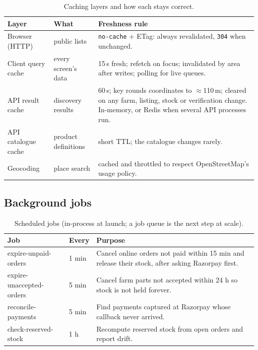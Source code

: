 \documentclass[11pt,a4paper]{article}
\begin{document}
\begin{table}[H]\centering\small
\begin{tabularx}{\linewidth}{@{}p{3cm}p{3.6cm}L@{}}
\toprule
\textbf{Layer} & \textbf{What} & \textbf{Freshness rule} \\
\midrule
Browser (HTTP) & public lists & \texttt{no-cache} + ETag: always revalidated, \texttt{304} when unchanged. \\
Client query cache & every screen's data & 15\,s fresh; refetch on focus; invalidated by area after writes; polling for live queues. \\
API result cache & discovery results & 60\,s; key rounds coordinates to $\approx$110\,m; cleared on any farm, listing, stock or verification change. In-memory, or Redis when several API processes run. \\
API catalogue cache & product definitions & short TTL; the catalogue changes rarely. \\
Geocoding & place search & cached and throttled to respect OpenStreetMap's usage policy. \\
\bottomrule
\end{tabularx}
\caption{Caching layers and how each stays correct.}
\end{table}

\subsection{Background jobs}

\begin{table}[H]\centering\small
\begin{tabular}{@{}llp{8cm}@{}}
\toprule
\textbf{Job} & \textbf{Every} & \textbf{Purpose} \\
\midrule
expire-unpaid-orders & 1 min & Cancel online orders not paid within 15 min and release their stock, after asking Razorpay first. \\
expire-unaccepted-orders & 5 min & Cancel farm parts not accepted within 24 h so stock is not held forever. \\
reconcile-payments & 5 min & Find payments captured at Razorpay whose callback never arrived. \\
check-reserved-stock & 1 h & Recompute reserved stock from open orders and report drift. \\
\bottomrule
\end{tabular}
\caption{Scheduled jobs (in-process at launch; a job queue is the next step at scale).}
\end{table}
\end{document}
